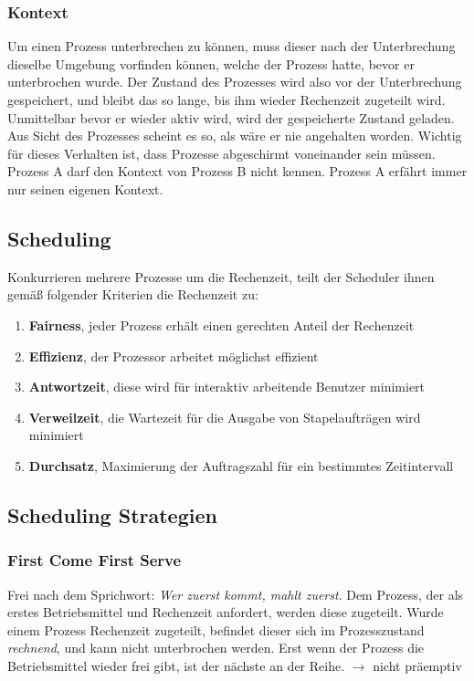 \documentclass[12pt,a4paper]{article}
\begin{document}
\subsubsection{Kontext}
Um einen Prozess unterbrechen zu können, muss dieser nach der Unterbrechung dieselbe Umgebung vorfinden können, welche der Prozess hatte, bevor er unterbrochen wurde. Der Zustand des Prozesses wird also vor der Unterbrechung gespeichert, und bleibt das so lange, bis ihm wieder Rechenzeit zugeteilt wird. Unmittelbar bevor er wieder aktiv wird, wird der gespeicherte Zustand geladen. Aus Sicht des Prozesses scheint es so, als wäre er nie angehalten worden.\newline
Wichtig für dieses Verhalten ist, dass Prozesse abgeschirmt voneinander sein müssen. Prozess A darf den Kontext von Prozess B nicht kennen. Prozess A erfährt immer nur seinen eigenen Kontext.

\subsection{Scheduling}
Konkurrieren mehrere Prozesse um die Rechenzeit, teilt der Scheduler ihnen gemäß folgender Kriterien die Rechenzeit zu:
\begin{enumerate}
	\item \textbf{Fairness}, jeder Prozess erhält einen gerechten Anteil der Rechenzeit
	\item \textbf{Effizienz}, der Prozessor arbeitet möglichst effizient
	\item \textbf{Antwortzeit}, diese wird für interaktiv arbeitende Benutzer minimiert
	\item \textbf{Verweilzeit}, die Wartezeit für die Ausgabe von Stapelaufträgen wird minimiert
	\item \textbf{Durchsatz}, Maximierung der Auftragszahl für ein bestimmtes Zeitintervall
\end{enumerate}

\subsection{Scheduling Strategien}

\subsubsection{First Come First Serve}
Frei nach dem Sprichwort: \textit{Wer zuerst kommt, mahlt zuerst}. Dem Prozess, der als erstes Betriebsmittel und Rechenzeit anfordert, werden diese zugeteilt. Wurde einem Prozess Rechenzeit zugeteilt, befindet dieser sich im Prozesszustand \textit{rechnend}, und kann nicht unterbrochen werden. Erst wenn der Prozess die Betriebsmittel wieder frei gibt, ist der nächste an der Reihe.\newline\newline
$\longrightarrow$ nicht präemptiv
\end{document}
